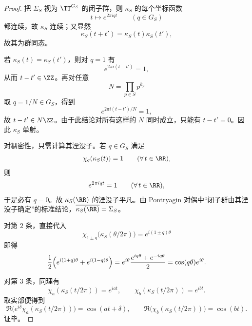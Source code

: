 \begin{proof}
把 \(\Sigma_S\) 视为 \(\TT^{G_S}\) 的闭子群，则 \(\kappa_S\) 的每个坐标函数
\[
t\longmapsto e^{2\pi iqt}
\qquad (q\in G_S)
\]
都连续，故 \(\kappa_S\) 连续；又显然
\[
\kappa_S(t+t')=\kappa_S(t)\kappa_S(t'),
\]
故其为群同态。

若 \(\kappa_S(t)=\kappa_S(t')\)，则对 \(q=1\) 有
\[
e^{2\pi i(t-t')}=1,
\]
从而 \(t-t'\in\ZZ\)。再对任意
\[
N=\prod_{p\in S}p^{k_p}
\]
取 \(q=1/N\in G_S\)，得到
\[
e^{2\pi i(t-t')/N}=1,
\]
故 \(t-t'\in N\ZZ\)。由于此结论对所有这样的 \(N\) 同时成立，只能有 \(t-t'=0\)。因此 \(\kappa_S\) 单射。

对稠密性，只需计算其湮没子。若 \(q\in G_S\) 满足
\[
\chi_q(\kappa_S(t))=1
\qquad
(\forall\, t\in\RR),
\]
则
\[
e^{2\pi iqt}=1
\qquad
(\forall\, t\in\RR),
\]
于是必有 \(q=0\)。故 \(\kappa_S(\RR)\) 的湮没子平凡。由 Pontryagin 对偶中“闭子群由其湮没子确定”的标准结论，\(\overline{\kappa_S(\RR)}=\Sigma_S\)。

对第 \(2\) 条，直接代入
\[
\chi_{1\pm q}\bigl(\kappa_S(\theta/2\pi)\bigr)=e^{i(1\pm q)\theta}
\]
即得
\[
\frac12\Bigl(e^{i(1+q)\theta}+e^{i(1-q)\theta}\Bigr)
=
e^{i\theta}\frac{e^{iq\theta}+e^{-iq\theta}}{2}
=
\cos(q\theta)e^{i\theta}.
\]

对第 \(3\) 条，同理有
\[
\chi_a(\kappa_S(t/2\pi))=e^{iat},
\qquad
\chi_b(\kappa_S(t/2\pi))=e^{ibt}.
\]
取实部便得到
\[
\Re\bigl(e^{i\delta}\chi_a(\kappa_S(t/2\pi))\bigr)=\cos(at+\delta),
\qquad
\Re\bigl(\chi_b(\kappa_S(t/2\pi))\bigr)=\cos(bt).
\]
证毕。
\end{proof}

